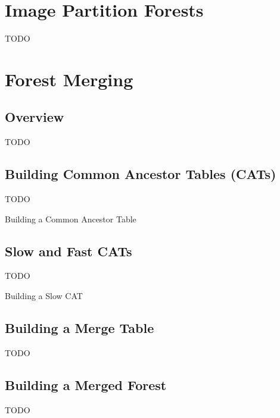 \documentclass[10pt,twocolumn,twoside]{IEEEtran}
\begin{document}
\section{Image Partition Forests}
\label{sec:ipfs}

TODO

\section{Forest Merging}
\label{sec:merging}

\subsection{Overview}

TODO

\subsection{Building Common Ancestor Tables (CATs)}

TODO

\begin{stulisting}[t]
\caption{Building a Common Ancestor Table}
\label{code:build-cat}

\end{stulisting}

\subsection{Slow and Fast CATs}

TODO

\begin{stulisting}[t]
\caption{Building a Slow CAT}
\label{code:build-slow-cat}

\end{stulisting}

\subsection{Building a Merge Table}

TODO

\subsection{Building a Merged Forest}

TODO
\end{document}
